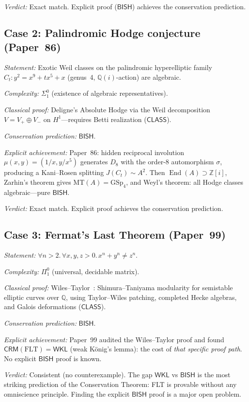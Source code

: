 \documentclass[11pt,a4paper]{article}
\theoremstyle{plain}
\theoremstyle{definition}
\newcommand{\BISH}{\textsf{BISH}}
\newcommand{\WKL}{\textsf{WKL}}
\newcommand{\CLASS}{\textsf{CLASS}}
\newcommand{\CRM}{\textsf{CRM}}
\newcommand{\Z}{\mathbb{Z}}
\newcommand{\Q}{\mathbb{Q}}
\DeclareMathOperator{\End}{End}
\begin{document}
\emph{Verdict:} Exact match.  Explicit proof ($\BISH$) achieves the conservation prediction.

\subsection{Case 2: Palindromic Hodge conjecture (Paper~86)}

\emph{Statement:} Exotic Weil classes on the palindromic hyperelliptic family $C_t : y^2 = x^9 + tx^5 + x$ (genus~4, $\Q(i)$-action) are algebraic.

\emph{Complexity:} $\Sigma^0_1$ (existence of algebraic representatives).

\emph{Classical proof:} Deligne's Absolute Hodge via the Weil decomposition $V = V_+ \oplus V_-$ on $H^1$---requires Betti realization ($\CLASS$).

\emph{Conservation prediction:} $\BISH$.

\emph{Explicit achievement:} Paper~86: hidden reciprocal involution $\mu(x,y) = (1/x, y/x^5)$ generates $D_8$ with the order-8 automorphism $\sigma$, producing a Kani--Rosen splitting $J(C_t) \sim A^2$.  Then $\End(A) \supset \Z[i]$, Zarhin's theorem gives $\mathrm{MT}(A) = \mathrm{GSp}_4$, and Weyl's theorem: all Hodge classes algebraic---pure $\BISH$.

\emph{Verdict:} Exact match.  Explicit proof achieves the conservation prediction.

\subsection{Case 3: Fermat's Last Theorem (Paper~99)}

\emph{Statement:} $\forall n > 2.\, \forall x,y,z > 0.\, x^n + y^n \ne z^n$.

\emph{Complexity:} $\Pi^0_1$ (universal, decidable matrix).

\emph{Classical proof:} Wiles--Taylor~\cite{wiles1995}: Shimura--Taniyama modularity for semistable elliptic curves over $\Q$, using Taylor--Wiles patching, completed Hecke algebras, and Galois deformations ($\CLASS$).

\emph{Conservation prediction:} $\BISH$.

\emph{Explicit achievement:} Paper~99 audited the Wiles--Taylor proof and found $\CRM(\mathrm{FLT}) = \WKL$ (weak K\"onig's lemma): the cost of \emph{that specific proof path}.  No explicit $\BISH$ proof is known.

\emph{Verdict:} Consistent (no counterexample).  The gap $\WKL$ vs $\BISH$ is the most striking prediction of the Conservation Theorem: FLT is provable without any omniscience principle.  Finding the explicit $\BISH$ proof is a major open problem.
\end{document}
